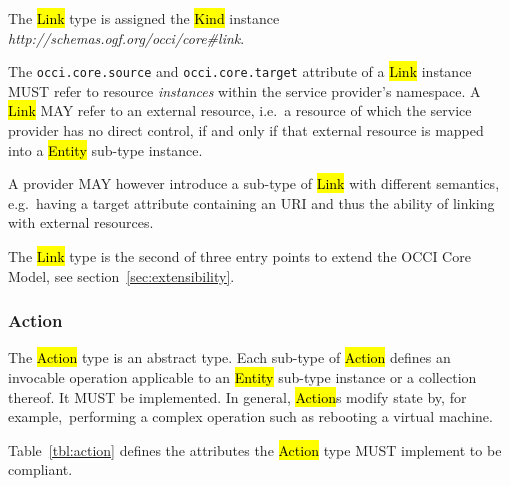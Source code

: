 \documentclass[10pt,a4paper]{article}
\begin{document}
The \hl{Link} type is assigned the \hl{Kind} instance
\textit{http://schemas.ogf.org/occi/core\#link}.


The {\tt occi.core.source} and {\tt occi.core.target} attribute of a \hl{Link} instance
MUST refer to resource {\em instances} within the service provider's
namespace. A \hl{Link} MAY refer to an external resource, i.e.~a
resource of which the service provider has no direct control, if and
only if that external resource is mapped into a \hl{Entity} sub-type
instance.

A provider MAY however introduce a sub-type of \hl{Link} with
different semantics, e.g.~having a target attribute containing an URI
and thus the ability of linking with external resources.

The \hl{Link} type is the second of three entry points to extend the
OCCI Core Model, see section~\ref{sec:extensibility}.

\subsubsection{Action}
The \hl{Action} type is an abstract type. Each sub-type of \hl{Action}
defines an invocable operation applicable to an \hl{Entity} sub-type
instance or a collection thereof. It MUST be implemented. In general,
\hl{Action}s modify state by, for example,~performing a complex
operation such as rebooting a virtual machine.

Table~\ref{tbl:action} defines the attributes the \hl{Action} type
MUST implement to be compliant.

\end{document}
